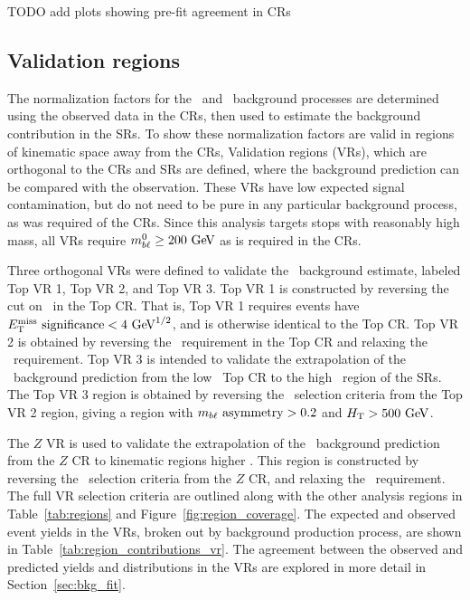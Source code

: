 {\color{red} TODO add plots showing pre-fit agreement in CRs}

\subsection{Validation regions}
\label{sec:vr}

The normalization factors for the \TTBAR\ and \ZGAMMAJETS\ background processes
are determined using the observed data in the CRs, then used to estimate the
background contribution in the SRs.
To show these normalization factors are valid in regions of kinematic space away
from the CRs, Validation regions (VRs), which are orthogonal to the CRs and SRs
are defined, where the background prediction can be compared with the
observation.
These VRs have low expected signal contamination, but do not need to be pure in
any particular background process, as was required of the CRs.
Since this analysis targets stops with reasonably high mass, all VRs require
$\MBL^0 \geq 200 \GeV$ as is required in the CRs.

Three orthogonal VRs were defined to validate the \TTBAR\ background estimate,
labeled Top VR 1, Top VR 2, and Top VR 3.
Top VR 1 is constructed by reversing the cut on \METSIG\ in the Top CR.
That is, Top VR 1 requires events have $\METSIG < 4 \GeV^{1/2}$, and is
otherwise identical to the Top CR.
Top VR 2 is obtained by reversing the \MBLASYM\ requirement in the Top CR and
relaxing the \METSIG\ requirement.
Top VR 3 is intended to validate the extrapolation of the \TTBAR\ background
prediction from the low \HT\ Top CR to the high \HT\ region of the SRs.
The Top VR 3 region is obtained by reversing the \HT\ selection criteria from
the Top VR 2 region, giving a region with $m_{b\ell}~\mathrm{asymmetry} > 0.2$ and $\HT > 500 \GeV$.

The $Z$ VR is used to validate the extrapolation of the \ZGAMMAJETS\ background
prediction from the $Z$ CR to kinematic regions higher \HT.
This region is constructed by reversing the \HT\ selection criteria from the
$Z$ CR, and relaxing the \METSIG\ requirement.
The full VR selection criteria are outlined along with the other analysis
regions in Table~\ref{tab:regions} and Figure~\ref{fig:region_coverage}.
The expected and observed event yields in the VRs, broken out by background
production process, are shown in Table~\ref{tab:region_contributions_vr}.
The agreement between the observed and predicted yields and distributions in the
VRs are explored in more detail in Section~\ref{sec:bkg_fit}.

